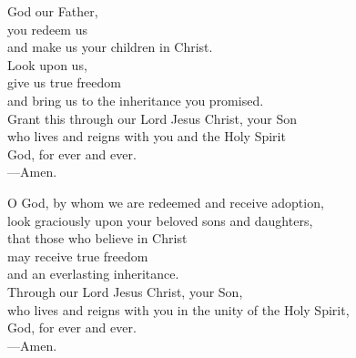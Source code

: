 \prayer


\begin{prayerverse}
God our Father,\\
you redeem us\\
and make us your children in Christ.\\
Look upon us,\\
give us true freedom\\
and bring us to the inheritance you promised.\\
Grant this through our Lord Jesus Christ, your Son\\
who lives and reigns with you and the Holy Spirit\\
God, for ever and ever.\\
{\color{red}---\thinspace}Amen.
\end{prayerverse}


\begin{prayerverse}
O God, by whom we are redeemed and receive adoption,\\
look graciously upon your beloved sons and daughters,\\
that those who believe in Christ\\
may receive true freedom\\
and an everlasting inheritance.\\
Through our Lord Jesus Christ, your Son,\\
who lives and reigns with you in the unity of the Holy Spirit,\\
God, for ever and ever.\\
{\color{red}---\thinspace}Amen.
\end{prayerverse}

